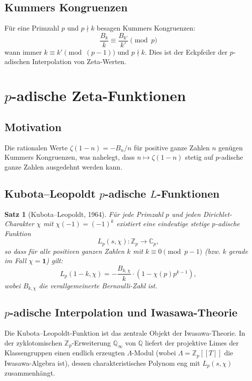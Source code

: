 \documentclass[12pt,a4paper]{amsart}
\newtheorem{theorem}{Satz}[section]
\theoremstyle{definition}
\theoremstyle{remark}
\begin{document}
\subsection{Kummers Kongruenzen}

Für eine Primzahl $p$ und $p \nmid k$ besagen Kummers Kongruenzen:
\[
  \frac{B_k}{k} \equiv \frac{B_{k'}}{k'} \pmod{p}
\]
wann immer $k \equiv k' \pmod{(p-1)}$ und $p \nmid k$.
Dies ist der Eckpfeiler der $p$-adischen Interpolation von Zeta-Werten.

\section{$p$-adische Zeta-Funktionen}

\subsection{Motivation}

Die rationalen Werte $\zeta(1-n) = -B_n/n$ für positive ganze Zahlen $n$ genügen
Kummers Kongruenzen, was nahelegt, dass $n \mapsto \zeta(1-n)$ stetig auf
$p$-adische ganze Zahlen ausgedehnt werden kann.

\subsection{Kubota--Leopoldt $p$-adische $L$-Funktionen}

\begin{theorem}[Kubota--Leopoldt, 1964]
  Für jede Primzahl $p$ und jeden Dirichlet-Charakter $\chi$ mit $\chi(-1) = (-1)^k$
  existiert eine eindeutige stetige $p$-adische Funktion
  \[
    L_p(s, \chi): \mathbb{Z}_p \to \mathbb{C}_p,
  \]
  so dass für alle positiven ganzen Zahlen $k$ mit $k \equiv 0 \pmod{p-1}$
  (bzw. $k$ gerade im Fall $\chi = \mathbf{1}$) gilt:
  \[
    L_p(1-k, \chi) = -\frac{B_{k,\chi}}{k} \cdot \left(1 - \chi(p) p^{k-1}\right),
  \]
  wobei $B_{k,\chi}$ die verallgemeinerte Bernoulli-Zahl ist.
\end{theorem}

\subsection{$p$-adische Interpolation und Iwasawa-Theorie}

Die Kubota--Leopoldt-Funktion ist das zentrale Objekt der Iwasawa-Theorie. In der
zyklotomischen $\mathbb{Z}_p$-Erweiterung $\mathbb{Q}_\infty$ von $\mathbb{Q}$
liefert der projektive Limes der Klassengruppen einen endlich erzeugten
$\Lambda$-Modul (wobei $\Lambda = \mathbb{Z}_p[[T]]$ die Iwasawa-Algebra ist),
dessen charakteristisches Polynom eng mit $L_p(s, \chi)$ zusammenhängt.
\end{document}
